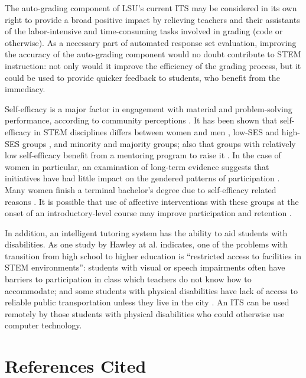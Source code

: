 \documentclass[hidelinks,11pt]{article}
\begin{document}
The auto-grading component of LSU’s current ITS may be considered in its own
right to provide a broad positive impact by relieving teachers and their
assistants of the labor-intensive and time-consuming tasks involved in grading
(code or otherwise). As a necessary part of automated response set evaluation,
improving the accuracy of the auto-grading component would no doubt contribute
to STEM instruction: not only would it improve the efficiency of the grading
process, but it could be used to provide quicker feedback to students, who
benefit from the immediacy.  



Self-efficacy is a major factor in engagement with material and problem-solving
performance, according to community perceptions \cite{vivian2014}. It has been
shown that self-efficacy in STEM disciplines differs between women and men
\cite{boy2013} \cite{gonzalez2012}, low-SES and high-SES groups
\cite{gonzalez2012}, and minority and majority groups; also that groups with
relatively low self-efficacy benefit from a mentoring program to raise it
\cite{macphee2013}.  In the case of women in particular, an examination of
long-term evidence suggests that initiatives have had little impact on the
gendered patterns of participation  \cite{smith2011}. Many women finish a
terminal bachelor's degree due to self-efficacy related reasons \cite{boy2013}.
It is possible that use of affective interventions with these groups at the
onset of an introductory-level course may improve participation and retention
\cite{jraidi2011}. 

In addition, an intelligent tutoring system has the ability to aid students
with disabilities.  As one study by Hawley at al.  indicates, one of the
problems with transition from high school to higher education is ``restricted
access to facilities in STEM environments'': students with visual or speech
impairments often have barriers to participation in class which teachers do not
know how to accommodate; and some students with physical disabilities have lack
of access to reliable public transportation unless they live in the city
\cite{hawley2013} \cite{chapman2014}. An ITS can be used remotely by those
students with physical disabilities who could otherwise use computer
technology.


\pagebreak
\section{ References Cited }



\end{document}

